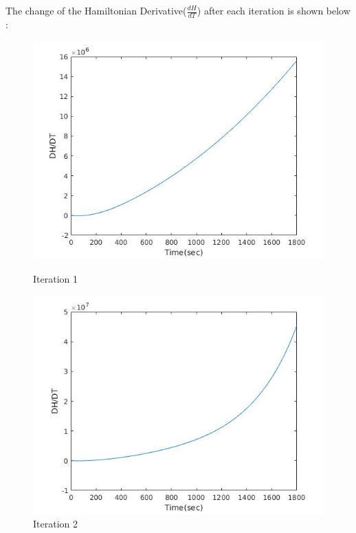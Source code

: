 \clearpage
The change of the Hamiltonian Derivative($\frac{dH}{dT}$) after each iteration is shown below : 
\begin{figure}[h!]
  \centering
  \begin{minipage}[b]{0.4\textwidth}
    \includegraphics[width=\textwidth]{h1.jpg}
    \caption{Iteration 1}
  \end{minipage}
  \hfill
  \begin{minipage}[b]{0.4\textwidth}
    \includegraphics[width=\textwidth]{h2.jpg}
    \caption{Iteration 2}
  \end{minipage}
\end{figure}
